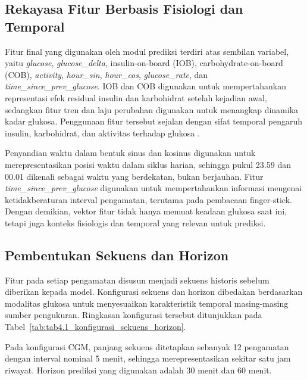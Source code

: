 \subsection{Rekayasa Fitur Berbasis Fisiologi dan Temporal} 
\label{subsec:bab4-rekayasa-fitur-prediksi}

Fitur final yang digunakan oleh modul prediksi terdiri atas sembilan variabel, yaitu \textit{glucose}, \textit{glucose\_delta}, insulin-on-board (IOB), carbohydrate-on-board (COB),
\textit{activity}, \textit{hour\_sin}, \textit{hour\_cos}, \textit{glucose\_rate}, dan \textit{time\_since\_prev\_glucose}. IOB dan COB digunakan untuk mempertahankan representasi efek
residual insulin dan karbohidrat setelah kejadian awal, sedangkan fitur tren dan laju perubahan digunakan untuk menangkap dinamika kadar glukosa. Penggunaan fitur tersebut sejalan
dengan sifat temporal pengaruh insulin, karbohidrat, dan aktivitas terhadap glukosa \parencite{bergman1979,dallaman2014,colberg2016}.

Penyandian waktu dalam bentuk sinus dan kosinus digunakan untuk merepresentasikan posisi waktu dalam siklus harian, sehingga pukul 23.59 dan 00.01 dikenali sebagai
waktu yang berdekatan, bukan berjauhan.
Fitur \textit{time\_since\_prev\_glucose} digunakan untuk mempertahankan informasi mengenai ketidakberaturan interval pengamatan, terutama pada pembacaan finger-stick. Dengan demikian,
vektor fitur tidak hanya memuat keadaan glukosa saat ini, tetapi juga konteks fisiologis dan temporal yang relevan untuk prediksi.

\subsection{Pembentukan Sekuens dan Horizon} 
\label{subsec:bab4-pembentukan-sekuens-horizon}

Fitur pada setiap pengamatan disusun menjadi sekuens historis sebelum diberikan kepada model. Konfigurasi sekuens dan horizon dibedakan berdasarkan modalitas glukosa untuk menyesuaikan
karakteristik temporal masing-masing sumber pengukuran. Ringkasan konfigurasi tersebut ditunjukkan pada Tabel~\ref{tab:tab4.1_konfigurasi_sekuens_horizon}.



Pada konfigurasi CGM, panjang sekuens ditetapkan sebanyak 12 pengamatan dengan interval nominal 5 menit, sehingga merepresentasikan sekitar satu jam riwayat. Horizon prediksi yang
digunakan adalah 30 menit dan 60 menit.

